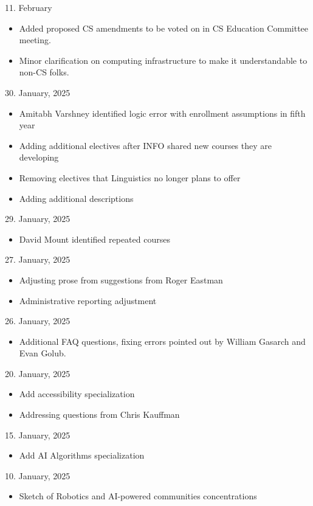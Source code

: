 11. February

\begin{itemize}
    \item Added proposed CS amendments to be voted on in CS Education Committee meeting.
    \item Minor clarification on computing infrastructure to make it understandable to non-CS folks.
\end{itemize}

30. January, 2025
\begin{itemize}
  \item Amitabh Varshney identified logic error with enrollment assumptions in fifth year
  \item Adding additional electives after INFO shared new courses they are developing
  \item Removing electives that Linguistics no longer plans to offer 
  \item Adding additional descriptions
\end{itemize}

29. January, 2025
\begin{itemize}
  \item David Mount identified repeated courses
\end{itemize}

27. January, 2025
\begin{itemize}
    \item Adjusting prose from suggestions from Roger Eastman
    \item Administrative reporting adjustment
\end{itemize}

26. January, 2025
\begin{itemize}
  \item Additional FAQ questions, fixing errors pointed out by William Gasarch and Evan Golub.
\end{itemize}

20. January, 2025
\begin{itemize}
 \item Add accessibility specialization
 \item Addressing questions from Chris Kauffman
\end{itemize}

15. January, 2025
\begin{itemize}
\item Add AI Algorithms specialization
\end{itemize}

10. January, 2025
\begin{itemize}
  \item Sketch of Robotics and AI-powered communities concentrations
\end{itemize}

